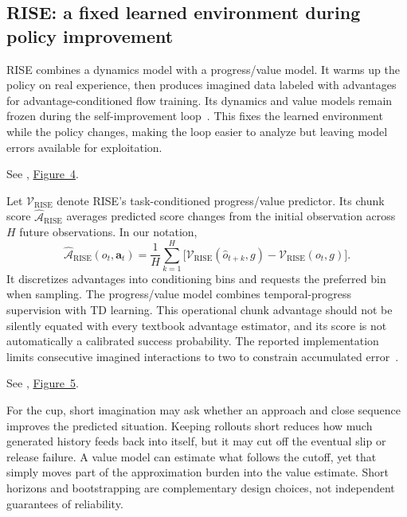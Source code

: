 \subsection{RISE: a fixed learned environment during policy improvement}
RISE combines a dynamics model with a progress/value model. It warms up the policy on real experience, then produces imagined data labeled with advantages for advantage-conditioned flow training. Its dynamics and value models remain frozen during the self-improvement loop~\citep{rise}. This fixes the learned environment while the policy changes, making the loop easier to analyze but leaving model errors available for exploitation.

\noindent See \citet{rise}, \href{https://arxiv.org/pdf/2602.11075v2}{Figure~4}.


Let $\mathcal V_{\mathrm{RISE}}$ denote RISE's task-conditioned progress/value predictor. Its chunk score $\widehat{\mathcal A}_{\mathrm{RISE}}$ averages predicted score changes from the initial observation across $H$ future observations. In our notation,
\begin{equation}
 \widehat{\mathcal A}_{\mathrm{RISE}}(o_t,\mathbf a_t)
 =\frac1H\sum_{k=1}^{H}
 \bigl[\mathcal V_{\mathrm{RISE}}(\widehat o_{t+k},g)-\mathcal V_{\mathrm{RISE}}(o_t,g)\bigr].
 \label{eq:rise}
\end{equation}
It discretizes advantages into conditioning bins and requests the preferred bin when sampling. The progress/value model combines temporal-progress supervision with TD learning. This operational chunk advantage should not be silently equated with every textbook advantage estimator, and its score is not automatically a calibrated success probability. The reported implementation limits consecutive imagined interactions to two to constrain accumulated error~\citep{rise}.

\noindent See \citet{rise}, \href{https://arxiv.org/pdf/2602.11075v2}{Figure~5}.


For the cup, short imagination may ask whether an approach and close sequence improves the predicted situation. Keeping rollouts short reduces how much generated history feeds back into itself, but it may cut off the eventual slip or release failure. A value model can estimate what follows the cutoff, yet that simply moves part of the approximation burden into the value estimate. Short horizons and bootstrapping are complementary design choices, not independent guarantees of reliability.

